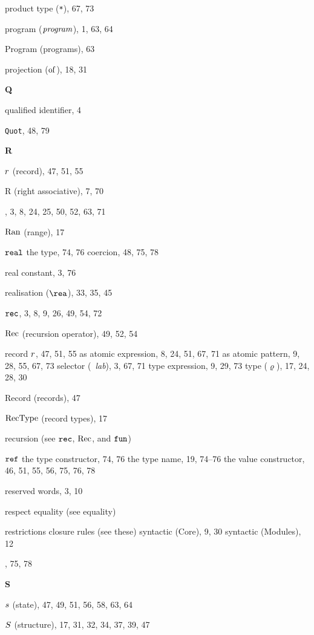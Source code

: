 \begin{theindex}
\item product type (\verb+*+), 67, 73
\item program ($\program$), 1, 63, 64
\item Program (programs), 63
\item projection ($\of{}{}$), 18, 31
\indexspace
\parbox{65mm}{\hfil{\large\bf Q}\hfil}
\indexspace
\item qualified identifier, 4
\item {\tt Quot}, 48, 79
\indexspace
\parbox{65mm}{\hfil{\large\bf R}\hfil}
\indexspace
\item $\r$ (record), 47, 51, 55
\item R (right associative), 7, 70
\item \RAISE, 3, 8, 24, 25, 50, 52, 63, 71
\item $\Ran$ (range), 17
\item $\REAL$ 
\subitem the type, 74, 76
\subitem coercion, 48, 75, 78
\item real constant, 3, 76
\item realisation ($\rea$), 33, 35, 45
\item $\REC$, 3, 8, 9, 26, 49, 54, 72
\item $\Rec$ (recursion operator), 49, 52, 54
\item record  
\subitem $\r$, 47, 51, 55
\subitem as atomic expression, 8, 24, 51, 67, 71
\subitem as atomic pattern, 9, 28, 55, 67, 73
\subitem selector (\ml{\#}\ {\it lab}), 3, 67, 71
\subitem type expression, 9, 29, 73
\subitem type ($\varrho$), 17, 24, 28, 30
\item Record (records), 47
\item $\RecType$ (record types), 17
\item recursion (see $\REC$, $\Rec$, and $\FUN$) 
\item $\REF$ 
\subitem the type constructor, 74, 76
\subitem the type name, 19, 74--76
\subitem the value constructor, 46, 51, 55, 56, 75, 76, 78
\item reserved words, 3, 10
\item respect equality (see equality) 
\item restrictions 
\subitem closure rules (see these) 
\subitem syntactic (Core), 9, 30
\subitem syntactic (Modules), 12
\item {}, 75, 78
\indexspace
\parbox{65mm}{\hfil{\large\bf S}\hfil}
\indexspace
\item $\s$ (state), 47, 49, 51, 56, 58, 63, 64
\item $\S$ (structure), 17, 31, 32, 34, 37, 39, 47

\end{theindex}

